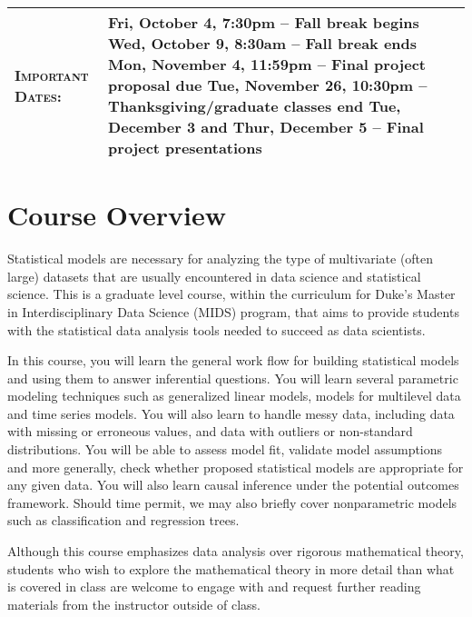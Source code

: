 \documentclass[11pt, a4paper]{article}
\begin{document}
\begin{center}
\begin{minipage}[t]{.9\textwidth}
\begin{tabular}{@{}L{3cm}L{12cm}}
\textsc{Important Dates:} & Fri, October 4, 7:30pm -- Fall break begins \newline Wed, October 9, 8:30am -- Fall break ends \newline Mon, November 4, 11:59pm -- Final project proposal due \newline Tue, November 26, 10:30pm -- Thanksgiving/graduate classes end \newline Tue, December 3 and Thur, December 5 -- Final project presentations \\
	 \bottomrule[0.065cm]
\end{tabular}
\end{minipage}
\end{center}


\vspace{.5cm}
\setlength{\unitlength}{1in}
\renewcommand{\arraystretch}{1.5}



\section{Course Overview}
Statistical models are necessary for analyzing the type of multivariate (often large) datasets that are usually encountered in data science and statistical science. This is a graduate level course, within the curriculum for Duke's Master in Interdisciplinary Data Science (MIDS) program, that aims to provide students with the statistical data analysis tools needed to succeed as data scientists. 

In this course, you will learn the general work flow for building statistical models and using them to answer inferential questions. You will learn several parametric modeling techniques such as generalized linear models, models for multilevel data and time series models. You will also learn to handle messy data, including data with missing or erroneous values, and data with outliers or non-standard distributions. You will be able to assess model fit, validate model assumptions and more generally, check whether proposed statistical models are appropriate for any given data. You will also learn causal inference under the potential outcomes framework. Should time permit, we may also briefly cover nonparametric models such as classification and regression trees. 

Although this course emphasizes data analysis over rigorous mathematical theory, students who wish to explore the mathematical theory in more detail than what is covered in class are welcome to engage with and request further reading materials from the instructor outside of class.
\end{document}
